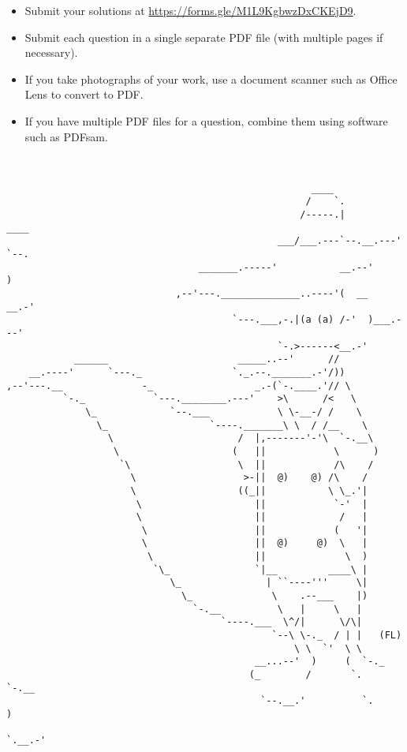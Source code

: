 \documentclass{article}
\begin{document}
\vfill
\begin{itemize}
	\item Submit your solutions at \url{https://forms.gle/M1L9KgbwzDxCKEjD9}.
	\item Submit each question in a single separate PDF file (with multiple pages if necessary).
	\item If you take photographs of your work, use a document scanner such as Office Lens to convert to PDF.
	\item If you have multiple PDF files for a question, combine them using software such as PDFsam.
\end{itemize}

\clearpage
~
\vfill
\centering
\begin{BVerbatim}
                                                      ____
                                                     /    `.
                                                    /-----.|          ____
                                                ___/___.---`--.__.---'    `--.
                                  _______.-----'           __.--'             )
                              ,--'---.______________..----'(  __         __.-'
                                        `---.___,-.|(a (a) /-'  )___.---'
                                                `-.>------<__.-'
            ______                       _____..--'      //
    __.----'      `---._                `._.--._______.-'/))
,--'---.__              -_                  _.-(`-.____.'// \
          `-._            `---.________.---'    >\      /<   \
              \_             `--.___            \ \-__-/ /    \
                \_                  `----._______\ \  / /__    \
                  \                      /  |,-------'-'\  `-.__\
                   \                    (   ||            \      )
                    `\                   \  ||            /\    /
                      \                   >-||  @)    @) /\    /
                      \                  ((_||           \ \_.'|
                       \                    ||            `-'  |
                       \                    ||             /   |
                        \                   ||            (   '|
                        \                   ||  @)     @)  \   |
                         \                  ||              \  )
                          `\_               `|__         ____\ |
                             \_               | ``----'''     \|
                               \_              \    .--___    |)
                                 `-.__          \   |     \   |
                                      `----.___  \^/|      \/\|
                                               `--\ \-._  / | |   (FL)
                                                   \ \  `'  \ \
                                            __...--'  )     (  `-._
                                           (_        /       `.    `-.__
                                             `--.__.'          `.       )
                                                                 `.__.-'
\end{BVerbatim}
\vfill
\end{document}
